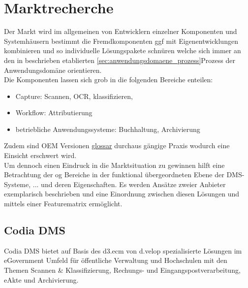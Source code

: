 \chapter{Marktrecherche}

\begin{comment}
Die Marktrecherche, auch related works genannt, beinhaltet die Recherche nach konkurrierenden Systemen, die teilweise oder vollständig die Funktionalitäten aufweisen wie sie für das zu entwickelte System geplant sind. Dabei sollte man Vor- und Nachteile gegenüber dem zu entwickelten System herausstellen. 
\end{comment}

Der Markt wird im allgemeinen von Entwicklern einzelner Komponenten und Systemhäusern bestimmt die Fremdkomponenten ggf mit Eigenentwicklungen kombinieren und so individuelle Lösungspakete schnüren welche sich immer an den in beschrieben etablierten \ref{sec:anwendungsdomaene_prozess}{Prozess} der Anwendungsdomäne orientieren.\\
Die Komponenten lassen sich grob in die folgenden Bereiche enteilen:
\begin{itemize}
\item Capture: Scannen, OCR, klassifizieren, 
\item Workflow: Attributierung
\item betriebliche Anwendungssysteme: Buchhaltung, Archivierung
\end{itemize}
\noindent
Zudem sind OEM Versionen \href{}{glossar} durchaus gängige Praxis wodurch eine Einsicht erschwert wird.\\
Um dennoch einen Eindruck in die Marktsituation zu gewinnen hilft eine Betrachtung der og Bereiche in der funktional übergeordneten Ebene der DMS-Systeme, ...  und deren Eigenschaften. Es werden Ansätze zweier Anbieter exemplarisch beschrieben und eine Einordnung zwischen diesen Lösungen und \brand mittels einer Featurematrix ermöglicht.


\section{Codia DMS }
%
%
Codia DMS bietet auf Basis des d3.ecm von d.velop spezialisierte Lösungen im eGovernment Umfeld für öffentliche Verwaltung und Hochschulen mit den Themen Scannen & Klassifizierung, Rechungs- und Eingangspostverarbeitung, eAkte und Archivierung.


